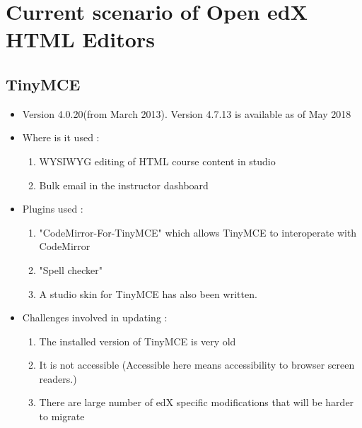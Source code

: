 \section{Current scenario of Open edX HTML Editors}

\subsection{TinyMCE}
\begin{itemize}
	\item Version 4.0.20(from March 2013). Version 4.7.13 is available as of May 2018
	\item Where is it used :
		\begin{enumerate}
			\item WYSIWYG editing of HTML course content in studio
			\item Bulk email in the instructor dashboard
		\end{enumerate}
	\item Plugins used :
		\begin{enumerate}
			\item "CodeMirror-For-TinyMCE" which allows TinyMCE to interoperate with CodeMirror
			\item "Spell checker"
			\item A studio skin for TinyMCE has also been written.
		\end{enumerate}
	\item Challenges involved in updating :
		\begin{enumerate}
			\item The installed version of TinyMCE is very old
			\item It is not accessible (Accessible here means accessibility to browser screen readers.)
			\item There are large number of edX specific modifications that will be harder to migrate
		\end{enumerate}
\end{itemize}

